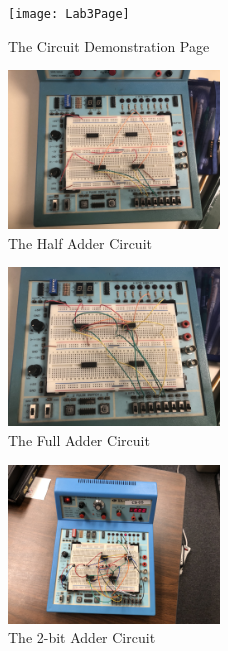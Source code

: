 \documentclass[11pt]{article}
\begin{document}
    \begin{figure}[ht]\centering
      \texttt{[image: Lab3Page]}
      \caption{The Circuit Demonstration Page}
      \label{fig:Lab3Page}
    \end{figure}

    \begin{figure}[ht]\centering
      \includegraphics[width=0.5\textwidth]{HalfAdder}
      \caption{The Half Adder Circuit}
      \label{fig:HalfAdder}
    \end{figure}

    \begin{figure}[ht]\centering
      \includegraphics[width=0.5\textwidth]{FullAdder}
      \caption{The Full Adder Circuit}
      \label{fig:FullAdder}
    \end{figure}

    \begin{figure}[ht]\centering
      \includegraphics[width=0.5\textwidth]{2-bitAdder}
      \caption{The 2-bit Adder Circuit}
      \label{fig:2-bitAdder}
    \end{figure}
\end{document}
